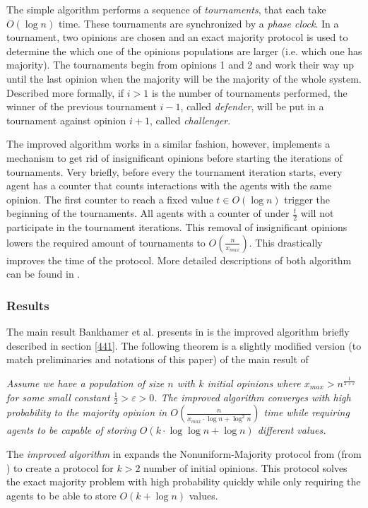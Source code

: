 The simple algorithm performs a sequence of \emph{tournaments}, that each take $O(\log n)$ time. These tournaments are synchronized by a \emph{phase clock}. In a tournament, two opinions are chosen and an exact majority protocol is used to determine the which one of the opinions populations are larger (i.e. which one has majority). The tournaments begin from opinions 1 and 2 and work their way up until the last opinion when the majority will be the majority of the whole system. Described more formally, if $i > 1$ is the number of tournaments performed, the winner of the previous tournament $i - 1$, called \emph{defender}, will be put in a tournament against opinion $i + 1$, called \emph{challenger}. 

The improved algorithm works in a similar fashion, however, implements a mechanism to get rid of insignificant opinions before starting the iterations of tournaments. Very briefly, before every the tournament iteration starts, every agent has a counter that counts interactions with the agents with the same opinion. The first counter to reach a fixed value $t \in O(\log n)$ trigger the beginning of the tournaments. All agents with a counter of under $\frac{t}{2}$ will not participate in the tournament iterations. This removal of insignificant opinions lowers the required amount of tournaments to $O(\frac{n}{x_{max}})$. This drastically improves the time of the protocol. More detailed descriptions of both algorithm can be found in \cite{bankhamerPopulationProtocolsExact2022}.

\subsubsection{Results}

The main result Bankhamer et al. presents in \cite{bankhamerPopulationProtocolsExact2022} is the improved algorithm briefly described in section \ref{441}. The following theorem is a slightly modified version (to match preliminaries and notations of this paper) of the main result of \cite{bankhamerPopulationProtocolsExact2022}

 \begin{theorem}
    \textit{
        Assume we have a population of size $n$ with $k$ initial opinions where $x_{max} > n^{\frac{1}{2 + \varepsilon}}$ for some small constant $\frac{1}{2} > \varepsilon > 0$. The \emph{improved algorithm} converges with high probability to the majority opinion in $O(\frac{n}{x_{max} \cdot \log n + \log^2 n})$ time while requiring agents to be capable of storing $O(k \cdot \log \log n + \log n)$ different values.}
 \end{theorem} 

The \emph{improved algorithm} in \cite{bankhamerPopulationProtocolsExact2022} expands the Nonuniform-Majority protocol from  (from \cite{dotyTimeSpaceOptimal2022}) to create a protocol for $k > 2$ number of initial opinions. This protocol solves the exact majority problem with high probability quickly while only requiring the agents to be able to store $O(k + \log n)$ values. 
